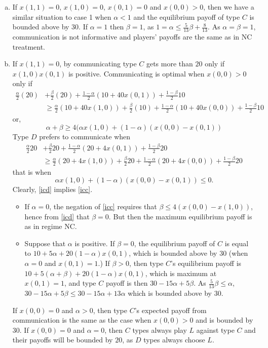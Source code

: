 \documentclass[12pt]{article}
\theoremstyle{break}
\begin{document}
\begin{enumerate}[(a)]
	\item If $x(1,1)=0$, $x(1,0)= 0$, $x(0,1)=0$ and $x(0,0)>0$, then we have a similar situation to case 1 when $\alpha < 1$ and the equilibrium payoff of type $C$ is bounded above by 30. If $\alpha = 1$ then $\beta = 1$, as $1=\alpha\leq \frac{5}{13}\beta + \frac{8}{13}$. As $\alpha=\beta=1$, communication is not informative and players' payoffs are the same as in NC treatment.
	
	\item If $x(1,1)=0$, by communicating type $C$ gets more than $20$ only if $x(1,0)x(0,1)$ is positive. Communicating is optimal when $x(0,0)>0$ only if
	\begin{align*}
		\frac{\alpha}{2} (20)&+\frac{\beta}{2}(20)+\frac{1-\alpha}{2}(10+40x(0,1))+\frac{1-\beta}{2}10\\ 
		&\geq \frac{\alpha}{2}(10+40x(1,0)) +\frac{\beta}{2}(10)+\frac{1-\alpha}{2}(10+40x(0,0))+\frac{1-\beta}{2}10
	\end{align*}
	or,
\begin{equation}\label{icc}
\alpha+\beta \geq 4 (\alpha x(1,0)+(1-\alpha)(x(0,0)-x(0,1))
\end{equation}
%
Type $D$ prefers to communicate when
%
\begin{align*}
	\frac{\alpha}{2}20&+\frac{\beta}{2}20+\frac{1-\alpha}{2}(20+4x(0,1))+\frac{1-\beta}{2}20\\ 
	&\geq \frac{\alpha}{2}(20+4x(1,0))+\frac{\beta}{2}20+\frac{1-\alpha}{2}(20+4x(0,0))+\frac{1-\beta}{2}20
\end{align*}
%
that is when%
\begin{equation}\label{icd}
	\alpha x(1,0)+(1-\alpha)(x(0,0)-x(0,1))\leq 0.
\end{equation}
%
Clearly, \eqref{icd} implies \eqref{icc}. 
\begin{itemize}
	\item If $\alpha=0$, the negation of \eqref{icc} requires that $\beta\leq 4(x(0,0)-x(1,0))$, hence from \eqref{icd} that $\beta=0$. But then the maximum equilibrium payoff is as in regime NC.
	\item  Suppose that $\alpha$ is positive. If $\beta=0$, the equilibrium payoff of $C$ is equal to $10+5\alpha+20(1-\alpha)x(0,1)$, which is bounded above by $30$ (when $\alpha=0$ and $x(0,1)=1$.) If $\beta>0$, then type $C$'s equilibrium payoff is $10+5(\alpha+\beta)+20(1-\alpha)x(0,1)$, which is maximum at $x(0,1)=1$, and type $C$ payoff is then $30-15\alpha+5\beta$. As $\frac{5}{13}\beta \leq \alpha$, $30-15\alpha+5\beta \leq 30-15 \alpha + 13 \alpha$ which is bounded above by $30$.
\end{itemize}

If $x(0,0)=0$ and $\alpha>0$, then type $C$'s expected payoff from communication is the same as the case when $x(0,0)>0$ and is bounded by $30$. If $x(0,0)=0$ and $\alpha=0$, then $C$ types always play $L$ against type $C$ and their payoffs will be bounded by $20$, as $D$ types always choose $L$.

\end{enumerate}
\end{document}
